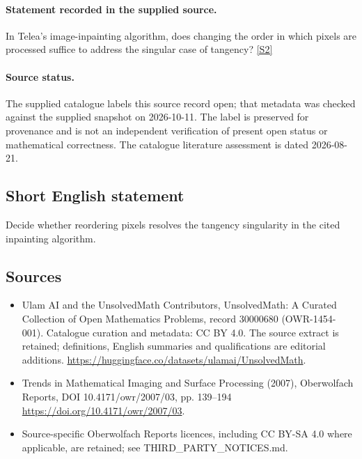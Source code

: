 \documentclass[11pt]{article}
\begin{document}
\paragraph{Statement recorded in the supplied source.}
In Telea's image-inpainting algorithm, does changing the order in which pixels are processed suffice to address the singular case of tangency? \href{https://doi.org/10.4171/owr/2007/03}{[S2]}
\paragraph{Source status.}
The supplied catalogue labels this source record open; that metadata was checked against the supplied snapshot on 2026-10-11. The label is preserved for provenance and is not an independent verification of present open status or mathematical correctness. The catalogue literature assessment is dated 2026-08-21.
\subsection{Short English statement}
Decide whether reordering pixels resolves the tangency singularity in the cited inpainting algorithm.
\subsection{Sources}
\begin{itemize}
\item[S1] Ulam AI and the UnsolvedMath Contributors, UnsolvedMath: A Curated Collection of Open Mathematics Problems, record 30000680 (OWR-1454-001). Catalogue curation and metadata: CC BY 4.0. The source extract is retained; definitions, English summaries and qualifications are editorial additions.
\url{https://huggingface.co/datasets/ulamai/UnsolvedMath}.
\item[S2] Trends in Mathematical Imaging and Surface Processing (2007), Oberwolfach Reports, DOI 10.4171/owr/2007/03, pp. 139--194
\url{https://doi.org/10.4171/owr/2007/03}.
\item Source-specific Oberwolfach Reports licences, including CC BY-SA 4.0 where applicable, are retained; see THIRD\_PARTY\_NOTICES.md.
\end{itemize}
\end{document}
